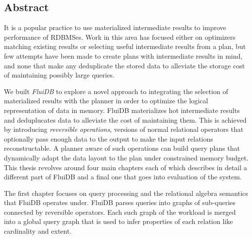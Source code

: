 \setcounter{page}{1}%

\maketitle%

\begin{precontent}
%

\chapter{Abstract}%
It is a popular practice to use materialized intermediate results to
improve performance of RDBMSes. Work in this area has focused either on
optimizers matching existing results or selecting useful intermediate
results from a plan, but few attempts have been made to create plans
with intermediate results in mind, and none that make any deduplicate
the stored data to alleviate the storage cost of maintaining possibly
large queries.

We built \emph{FluiDB} to explore a novel approach to integrating the
selection of materialized results with the planner in order to
optimize the logical representation of data in memory. FluiDB
materializes hot intermediate results and deduplucates data to
alleviate the cost of maintaining them. This is achieved by
introducing \emph{reversible operations}, versions of normal relational
operators that optionally pass enough data to the output to make the
input relations reconstructable. A planner aware of such operations
can build query plans that dynamically adapt the data layout to the
plan under constrained memory budget. This thesis revolves around four
main chapters each of which describes in detail a different part of
FluiDB and a final one that goes into evaluation of the system.

The first chapter focuses on query processing and the relational
algebra semantics that FluiDB operates under. FluiDB parses queries
into graphs of sub-queries connected by reversible operators. Each
such graph of the workload is merged into a global query graph that is
used to infer properties of each relation like cardinality and
extent.


\end{precontent}
